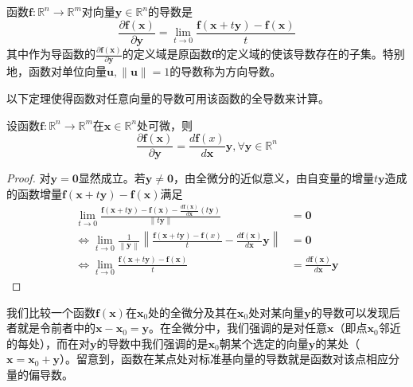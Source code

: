 \documentclass[main.tex]{subfiles}
\begin{document}
\begin{definition}
函数$\mathbf{f}:\mathbb{R}^n\rightarrow\mathbb{R}^m$对向量$\mathbf{y}\in\mathbb{R}^n$的导数是
\[\frac{\partial\mathbf{f}\left(\mathbf{x}\right)}{\partial\mathbf{y}}=\lim_{t\to 0}\frac{\mathbf{f}\left(\mathbf{x}+t\mathbf{y}\right)-\mathbf{f}\left(\mathbf{x}\right)}{t}\]
其中作为导函数的$\frac{\partial \mathbf{f}\left(\mathbf{x}\right)}{\partial\mathbf{y}}$的定义域是原函数$\mathbf{f}$的定义域的使该导数存在的子集。特别地，函数对单位向量$\mathbf{u},\left\|\mathbf{u}\right\|=1$的导数称为方向导数。
\end{definition}

以下定理使得函数对任意向量的导数可用该函数的全导数来计算。

\begin{theorem}\label{thm:II.11.6}
设函数$\mathbf{f}:\mathbb{R}^n\rightarrow\mathbb{R}^m$在$\mathbf{x}\in\mathbb{R}^n$处可微，则
\[\frac{\partial\mathbf{f}\left(\mathbf{x}\right)}{\partial\mathbf{y}}=\frac{d\mathbf{f}\left(x\right)}{d\mathbf{x}}\mathbf{y},\forall\mathbf{y}\in\mathbb{R}^n\]
\end{theorem}
\begin{proof}
对$\mathbf{y}=\mathbf{0}$显然成立。若$\mathbf{y}\neq\mathbf{0}$，由全微分的近似意义，由自变量的增量$t\mathbf{y}$造成的函数增量$\mathbf{f}\left(\mathbf{x}+t\mathbf{y}\right)-\mathbf{f}\left(\mathbf{x}\right)$满足
\begin{align*}
\lim_{t\to 0}\frac{\mathbf{f}\left(\mathbf{x}+t\mathbf{y}\right)-\mathbf{f}\left(\mathbf{x}\right)-\frac{d\mathbf{f}\left(\mathbf{x}\right)}{d\mathbf{x}}\left(t\mathbf{y}\right)}{\left\|t\mathbf{y}\right\|}&=\mathbf{0}\\
\Leftrightarrow\lim_{t\to 0}\frac{1}{\left\|\mathbf{y}\right\|}\left\|\frac{\mathbf{f}\left(\mathbf{x}+t\mathbf{y}\right)-\mathbf{f}\left(x\right)}{t}-\frac{d\mathbf{f}\left(\mathbf{x}\right)}{d\mathbf{x}}\mathbf{y}\right\|&=\mathbf{0}\\
\Leftrightarrow\lim_{t\to 0}\frac{\mathbf{f}\left(\mathbf{x}+t\mathbf{y}\right)-\mathbf{f}\left(\mathbf{x}\right)}{t}&=\frac{d\mathbf{f}\left(\mathbf{x}\right)}{d\mathbf{x}}\mathbf{y}
\end{align*}
\end{proof}

我们比较一个函数$\mathbf{f}\left(\mathbf{x}\right)$在$\mathbf{x}_0$处的全微分及其在$\mathbf{x}_0$处对某向量$\mathbf{y}$的导数可以发现后者就是令前者中的$\mathbf{x}-\mathbf{x}_0=\mathbf{y}$。在全微分中，我们强调的是对任意$\mathbf{x}$（即点$\mathbf{x}_0$邻近的每处），而在对$\mathbf{y}$的导数中我们强调的是$\mathbf{x}_0$朝某个选定的向量$\mathbf{y}$的某处（$\mathbf{x}=\mathbf{x}_0+\mathbf{y}$）。留意到，函数在某点处对标准基向量的导数就是函数对该点相应分量的偏导数。
\end{document}
